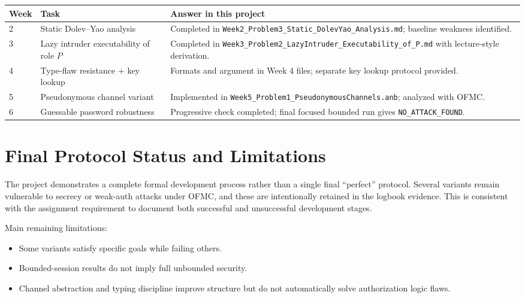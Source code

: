 \documentclass[11pt,a4paper]{article}
\begin{document}
\begin{tabular}{@{}p{1.5cm}p{5cm}p{7.5cm}@{}}
\toprule
Week & Task & Answer in this project \\
\midrule
2 & Static Dolev--Yao analysis & Completed in \texttt{Week2\_Problem3\_Static\_DolevYao\_Analysis.md}; baseline weakness identified. \\
3 & Lazy intruder executability of role $P$ & Completed in \texttt{Week3\_Problem2\_LazyIntruder\_Executability\_of\_P.md} with lecture-style derivation. \\
4 & Type-flaw resistance + key lookup & Formats and argument in Week 4 files; separate key lookup protocol provided. \\
5 & Pseudonymous channel variant & Implemented in \texttt{Week5\_Problem1\_PseudonymousChannels.anb}; analyzed with OFMC. \\
6 & Guessable password robustness & Progressive check completed; final focused bounded run gives \texttt{NO\_ATTACK\_FOUND}. \\
\bottomrule
\end{tabular}

\section{Final Protocol Status and Limitations}

The project demonstrates a complete formal development process rather than a single final ``perfect'' protocol.
Several variants remain vulnerable to secrecy or weak-auth attacks under OFMC, and these are intentionally retained in the logbook evidence.
This is consistent with the assignment requirement to document both successful and unsuccessful development stages.

Main remaining limitations:
\begin{itemize}[leftmargin=1.2em]
  \item Some variants satisfy specific goals while failing others.
  \item Bounded-session results do not imply full unbounded security.
  \item Channel abstraction and typing discipline improve structure but do not automatically solve authorization logic flaws.
\end{itemize}
\end{document}
